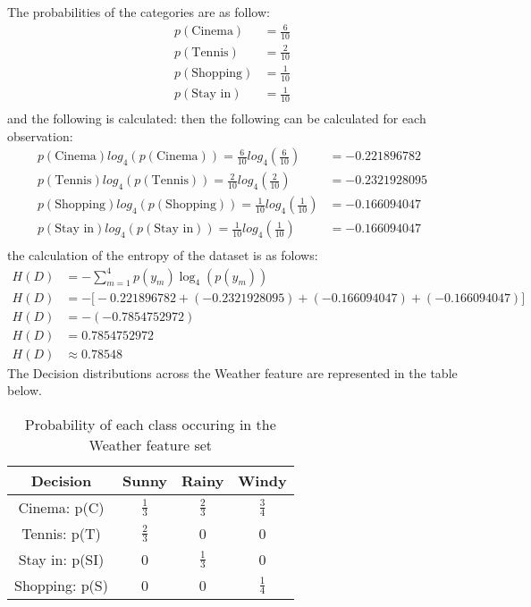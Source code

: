 \documentclass[10pt]{article}
\begin{document}
The probabilities of the categories are as follow:
\begin{align*}
    p(\text{Cinema}) &= \frac{6}{10} \\
    p(\text{Tennis}) &= \frac{2}{10} \\
    p(\text{Shopping}) &= \frac{1}{10} \\
    p(\text{Stay in}) &= \frac{1}{10} \\
\end{align*}
and the following is calculated:
then the following can be calculated for each observation:
\begin{align*}
    p(\text{Cinema}) log_4 \left( p(\text{Cinema}) \right) = \frac{6}{10} log_4 \left( \frac{6}{10} \right) &= -0.221896782\\
    p(\text{Tennis}) log_4 \left( p(\text{Tennis}) \right) = \frac{2}{10} log_4 \left( \frac{2}{10} \right) &= -0.2321928095\\
    p(\text{Shopping}) log_4 \left( p(\text{Shopping}) \right) = \frac{1}{10} log_4 \left( \frac{1}{10} \right) &= -0.166094047\\
    p(\text{Stay in}) log_4 \left( p(\text{Stay in}) \right) = \frac{1}{10} log_4 \left( \frac{1}{10} \right) &= -0.166094047\\
\end{align*}
the calculation of the entropy of the dataset is as folows:
\begin{align*}
    H(D) &= - \sum_{m=1}^{4} p(y_m) \log_4 \left( p(y_m) \right) \\
    H(D) &= - \big[ -0.221896782 + (-0.2321928095) + (-0.166094047) + (-0.166094047)\big] \\
    H(D) &= - (-0.7854752972) \\
    H(D) &= 0.7854752972 \\
    H(D) &\approx 0.78548
\end{align*}
The Decision distributions across the Weather feature are represented in the table below.
\begin{table}[h!]
    \centering
    \renewcommand{\arraystretch}{1.5}
    \begin{tabular}{|c|c|c|c|}
    \hline
    \textbf{Decision} & \textbf{Sunny} & \textbf{Rainy} & \textbf{Windy} \\ \hline
    Cinema: p(C) & $\frac{1}{3}$ & $\frac{2}{3}$ & $\frac{3}{4}$ \\ \hline
    Tennis: p(T) & $\frac{2}{3}$ & 0 & 0 \\ \hline
    Stay in: p(SI) & 0 & $\frac{1}{3}$ & 0 \\ \hline
    Shopping: p(S) & 0 & 0 & $\frac{1}{4}$ \\ \hline
    \end{tabular}
    \caption{Probability of each class occuring in the Weather feature set}
    \label{weather}
\end{table}
\end{document}
